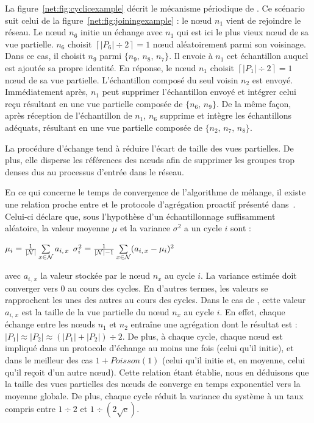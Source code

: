 La figure~\ref{net:fig:cyclicexample} décrit le mécanisme périodique de
\SPRAY. Ce scénario suit celui de la figure~\ref{net:fig:joiningexample} : le
nœud $n_1$ vient de rejoindre le réseau. Le nœud $n_6$ initie un échange avec
$n_1$ qui est ici le plus vieux nœud de sa vue partielle. $n_6$ choisit
$\left\lceil{|P_6|\div 2}\right\rceil = 1$ nœud aléatoirement parmi son
voisinage. Dans ce cas, il choisit $n_9$ parmi $\{n_9,\,n_8,\,n_7\}$. Il envoie
à $n_1$ cet échantillon auquel est ajoutée sa propre identité. En réponse, le
nœud $n_1$ choisit $\left\lceil{|P_1|\div 2}\right\rceil = 1$ nœud de sa vue
partielle. L'échantillon composé du seul voisin $n_2$ est envoyé. Immédiatement
après, $n_1$ peut supprimer l'échantillon envoyé et intégrer celui reçu
résultant en une vue partielle composée de $\{n_6,\, n_9\}$.  De la même façon,
après réception de l'échantillon de $n_1$, $n_6$ supprime et intègre les
échantillons adéquats, résultant en une vue partielle composée de
$\{n_2,\,n_7,\,n_8\}$.

La procédure d'échange tend à réduire l'écart de taille des vues partielles. De
plus, elle disperse les références des nœuds afin de supprimer les groupes trop
denses dus au processus d'entrée dans le réseau.

En ce qui concerne le temps de convergence de l'algorithme de mélange, il existe
une relation proche entre \SPRAY et le protocole d'agrégation proactif
présenté dans~\cite{jelasity2004epidemic, montresor2004robust}. Celui-ci déclare
que, sous l'hypothèse d'un échantillonnage suffisamment aléatoire, la valeur
moyenne $\mu$ et la variance $\sigma^2$ a un cycle $i$ sont :
\begin{center}
  $\mu_i = {1\over{|\mathcal{N}|}} \sum\limits_{x \in \mathcal{N}} a_{i,\,x}$
  \hfill
  $\sigma^2_i = {1\over{|\mathcal{N}|-1}}\sum\limits_{x \in \mathcal{N}}
  (a_{i,\,x} - \mu_i)^2$
\end{center}
avec $a_{i,\,x}$ la valeur stockée par le nœud $n_x$ au cycle $i$. La variance
estimée doit converger vers 0 au cours des cycles. En d'autres termes, les
valeurs se rapprochent les unes des autres au cours des cycles. Dans le cas de
\SPRAY, cette valeur $a_{i,\,x}$ est la taille de la vue partielle du nœud $n_x$
au cycle $i$. En effet, chaque échange entre les nœuds $n_1$ et $n_2$ entraîne
une agrégation dont le résultat est :
$|P_1|\approx|P_2|\approx{(|P_1| + |P_2|) \div 2}$.  De plus, à chaque cycle,
chaque nœud est impliqué dans un protocole d'échange au moins une fois (celui
qu'il initie), et dans le meilleur des cas $1+Poisson(1)$ (celui qu'il initie
et, en moyenne, celui qu'il reçoit d'un autre nœud). Cette relation étant
établie, nous en déduisons que la taille des vues partielles des nœuds de \SPRAY
converge en temps exponentiel vers la moyenne globale. De plus, chaque cycle
réduit la variance du système à un taux compris entre ${1\div 2}$ et
$1\div ({2\sqrt{\text{e}}})$.

